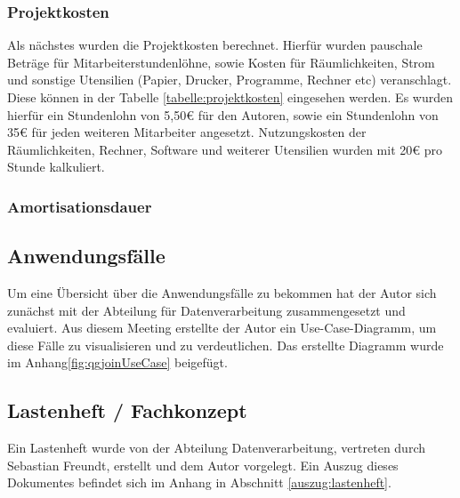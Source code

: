 \subsubsection{Projektkosten}
Als nächstes wurden die Projektkosten berechnet. Hierfür wurden pauschale Beträge 
für Mitarbeiterstundenlöhne, sowie Kosten für Räumlichkeiten, Strom und sonstige Utensilien 
(Papier, Drucker, Programme, Rechner etc) veranschlagt. Diese können in der Tabelle 
\ref{tabelle:projektkosten} eingesehen werden. Es wurden hierfür ein Stundenlohn von 5,50€ für den
Autoren, sowie ein Stundenlohn von 35€ für jeden weiteren Mitarbeiter angesetzt. Nutzungskosten 
der Räumlichkeiten, Rechner, Software und weiterer Utensilien wurden mit 20€ pro Stunde kalkuliert. \par


\subsubsection{Amortisationsdauer}


\subsection{Anwendungsfälle}
Um eine Übersicht über die Anwendungsfälle zu bekommen hat der Autor sich zunächst mit der Abteilung für Datenverarbeitung zusammengesetzt und evaluiert. Aus diesem Meeting erstellte der Autor ein Use-Case-Diagramm, um diese Fälle zu visualisieren und zu verdeutlichen. Das erstellte Diagramm wurde
im Anhang\ref{fig:qgjoinUseCase} beigefügt.


\subsection{Lastenheft / Fachkonzept}
Ein Lastenheft wurde von der Abteilung Datenverarbeitung, vertreten durch Sebastian Freundt,
erstellt und dem Autor vorgelegt. Ein Auszug dieses Dokumentes befindet sich im Anhang in Abschnitt \ref{auszug:lastenheft}.\par




\clearpage